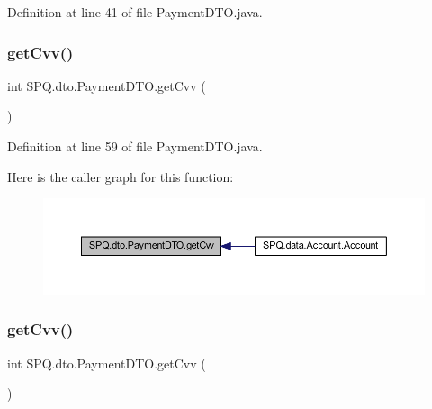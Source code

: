 Definition at line 41 of file Payment\+D\+T\+O.\+java.

\mbox{\label{class_s_p_q_1_1dto_1_1_payment_d_t_o_a64fb9df59333fcc2a0c8bea48024354d}} 
\subsubsection{\texorpdfstring{get\+Cvv()}{getCvv()}\hspace{0.1cm}{\footnotesize\ttfamily [1/3]}}
{\footnotesize\ttfamily int S\+P\+Q.\+dto.\+Payment\+D\+T\+O.\+get\+Cvv (\begin{DoxyParamCaption}{ }\end{DoxyParamCaption})}



Definition at line 59 of file Payment\+D\+T\+O.\+java.

Here is the caller graph for this function\+:
\nopagebreak
\begin{figure}[H]
\begin{center}
\leavevmode
\includegraphics[width=350pt]{class_s_p_q_1_1dto_1_1_payment_d_t_o_a64fb9df59333fcc2a0c8bea48024354d_icgraph}
\end{center}
\end{figure}
\mbox{\label{class_s_p_q_1_1dto_1_1_payment_d_t_o_a64fb9df59333fcc2a0c8bea48024354d}} 
\subsubsection{\texorpdfstring{get\+Cvv()}{getCvv()}\hspace{0.1cm}{\footnotesize\ttfamily [2/3]}}
{\footnotesize\ttfamily int S\+P\+Q.\+dto.\+Payment\+D\+T\+O.\+get\+Cvv (\begin{DoxyParamCaption}{ }\end{DoxyParamCaption})}



